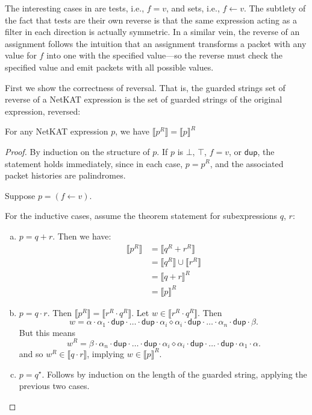 \documentclass[acmsmall,dvipsnames,nonacm]{acmart}
\newcommand\pk{\alpha}
\newcommand\pkp{\beta}
\newcommand\dup{\mathsf{dup}}
\newcommand\ddd{\cdot\dup\cdot}
\newcommand\NetKAT{\textsf{NetKAT}\xspace}
\newcommand{\Sem}[1]{\llbracket #1 \rrbracket}
\newcommand\zero{\bot}%
\newcommand\one{\top}%
\begin{document}
The interesting cases in  are tests, i.e., $f = v$, and
sets, i.e., $f \gets v$. The subtlety of the fact that tests are their own
reverse is that the same expression acting as a filter in each
direction is actually symmetric. In a similar vein, the reverse of an assignment
follows the intuition that an assignment transforms a packet with any value for
$f$ into one with the specified value---so the reverse must check the specified
value and emit packets with all possible values. 

First we show the correctness of reversal. That is, the guarded strings set of
reverse of a \NetKAT expression is the set of guarded strings of the original
expression, reversed:

\begin{theorem}
    For any \NetKAT expression $p$, we have $\Sem{p^R} = \Sem{p}^R$
\end{theorem}
\begin{proof}
    By induction on the structure of $p$. If $p$ is $\zero$, $\one$, $f=v$, or
  $\dup$, the statement holds immediately, since in each case, $p = p^R$, and
  the associated packet histories are palindromes.

    Suppose $p = (f \gets v)$.

    For the inductive cases, assume the theorem statement for subexpressions $q$, $r$:
\begin{enumerate}[(a)]
    \item $p = q + r$. Then we have:
    \begin{align*}
        \Sem{p^R} &= \Sem{q^R + r^R} \\
               &= \Sem{q^R} \cup \Sem{r^R} \\
               &= \Sem{q+r}^R \\
               &= \Sem{p}^R
    \end{align*}
    \item $p = q \cdot r$. Then $\Sem{p^R} = \Sem{r^R\cdot q^R}$. Let 
    $w \in \Sem{r^R\cdot q^R}$. Then 
    \[ w = \pk \cdot \pk_1 \cdot \dup \cdot \ldots \cdot \dup \cdot \pk_i \diamond \pk_i
    \cdot \dup \cdot \ldots \cdot \pk_n \cdot \dup \cdot \pkp.\]
    But this means
    \[ w^R = \pkp \cdot \pk_n \ddd\ldots\ddd \pk_i \diamond \pk_i \cdot\dup\cdot\ldots\cdot\dup\cdot\pk_1\cdot\pk. \]
    and so $w^R \in \Sem{q\cdot r}$, implying $w \in \Sem{p}^R$.
    \item $p = q^\star$. Follows by induction on the length of the guarded string,
    applying the previous two cases.
\end{enumerate}
\end{proof}
\end{document}

